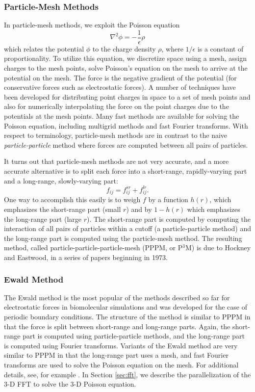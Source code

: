 \subsubsection*{Particle-Mesh Methods}  
In particle-mesh methods, we exploit
the Poisson equation
\[
 \nabla^2 \phi = -\frac{1}{\epsilon} \rho
\]
which relates the potential $\phi$ to the charge density $\rho$, where
$1/\epsilon$ is a constant of proportionality.  To utilize this equation, we
discretize space using a mesh, assign charges to the mesh points, solve
Poisson's equation on the mesh to arrive at the potential on the mesh.
The force is the negative gradient of the potential (for conservative
forces such as electrostatic forces).  A number of techniques have been
developed for distributing point charges in space to a set of mesh points
and also for numerically interpolating the force on the
point charges due to the potentials at the mesh points.  Many fast methods
are available for solving the Poisson equation, including multigrid
methods and fast Fourier transforms.  With respect
to terminology, particle-mesh methods are in contrast to the naive {\em
particle-particle} method where forces are computed between all pairs
of particles.

It turns out that particle-mesh methods are not very accurate,
and a more accurate alternative is to split each force into a short-range,
rapidly-varying part and a long-range, slowly-varying part:
\[
f_{ij} = f_{ij}^{sr} + f_{ij}^{lr} .
\]
One way to accomplish this easily is to weigh $f$ by a function $h(r)$,
which emphasizes the short-range part (small $r$) and by $1-h(r)$ which
emphasizes the long-range part (large $r$).  The short-range part is
computed by computing the interaction of all pairs of particles
within a cutoff (a particle-particle method) and the long-range part
is computed using the particle-mesh method.  The resulting method,
called particle-particle-particle-mesh (PPPM, or P$^3$M) is due to
Hockney and Eastwood, in a series of papers beginning in 1973.

\subsubsection*{Ewald Method}  
The Ewald method is the most popular of the methods
described so far for electrostatic forces in biomolecular simulations and
was developed for the case of periodic boundary conditions.  The structure
of the method is similar to PPPM in that the force is split
between short-range and long-range parts.  Again, the short-range part is
computed using particle-particle methods, and the long-range part is
computed using Fourier transforms.  Variants of the Ewald method are
very similar to PPPM in that the long-range part uses a mesh, and fast
Fourier transforms are used to solve the Poisson equation on the mesh.
For additional details, see, for example \cite{frenkel-smit}.  
In Section \ref{sec:fft}, we describe the
parallelization of the 3-D FFT to solve the 3-D Poisson equation.

